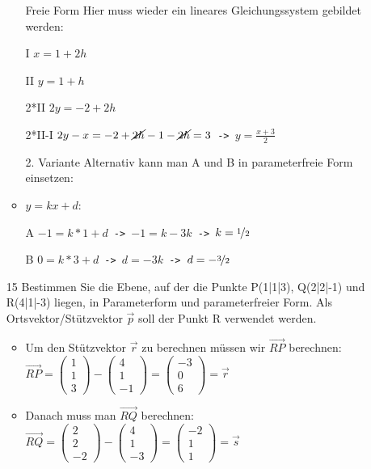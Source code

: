 \documentclass{article}
\begin{document}
\begin{itemize}
\begin{itemize}
			\item[Freie Form]{Hier muss wieder ein lineares Gleichungssystem gebildet werden:}
			\item[I]{$x=1+2h$}
			\item[II]{$y=1+h$}
			\item[2*II]{$2y=-2+2h$}
			\item[2*II-I]{$2y-x=-2+\cancel{2h}-1-\cancel{2h}=3$\texttt{ -> }$y=\frac{x+3}{2}$}
			\item[2. Variante]{Alternativ kann man A und B in parameterfreie Form einsetzen:}
			\item{$y=kx+d$:}
			\item[A]{$-1=k*1+d$\texttt{ -> }$-1=k-3k$\texttt{ -> }$k=\nicefrac{1}{2}$}
			\item[B]{$0=k*3+d$\texttt{ -> }$d=-3k$\texttt{ -> }$d=-\nicefrac{3}{2}$}
			\end{itemize}
			\item[15]{Bestimmen Sie die Ebene, auf der die Punkte P(1|1|3), Q(2|2|-1) und R(4|1|-3) liegen, in Parameterform und parameterfreier Form. Als Ortsvektor/Stützvektor $\vec{p}$ soll der Punkt R verwendet werden.}
			\begin{itemize}
				\item{Um den Stützvektor $\vec{r}$ zu berechnen müssen wir $\overrightarrow{RP}$ berechnen: $\overrightarrow{RP}=\begin{pmatrix} 1 \\ 1 \\ 3 \end{pmatrix} -\begin{pmatrix} 4 \\ 1 \\ -1 \end{pmatrix}=\begin{pmatrix} -3 \\ 0 \\ 6 \end{pmatrix}=\vec{r}$}
				\item{Danach muss man $\overrightarrow{RQ}$ berechnen: $\overrightarrow{RQ}=\begin{pmatrix} 2 \\ 2 \\ -2 \end{pmatrix}-\begin{pmatrix} 4 \\ 1 \\ -3 \end{pmatrix}=\begin{pmatrix} -2 \\ 1 \\ 1 \end{pmatrix}=\vec{s}$}

\end{itemize}
\end{itemize}
\end{document}
